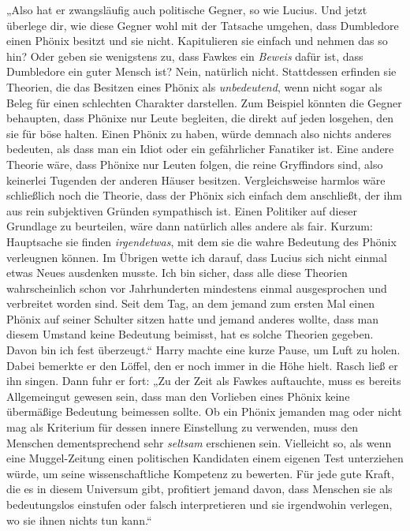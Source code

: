 „Also hat er zwangsläufig auch politische Gegner, so wie Lucius. Und jetzt überlege dir, wie diese Gegner wohl mit der Tatsache umgehen, dass Dumbledore einen Phönix besitzt und sie nicht. Kapitulieren sie einfach und nehmen das so hin? Oder geben sie wenigstens zu, dass Fawkes ein \emph{Beweis} dafür ist, dass Dumbledore ein guter Mensch ist? Nein, natürlich nicht. Stattdessen erfinden sie Theorien, die das Besitzen eines Phönix als \emph{unbedeutend}, wenn nicht sogar als Beleg für einen schlechten Charakter darstellen. Zum Beispiel könnten die Gegner behaupten, dass Phönixe nur Leute begleiten, die direkt auf jeden losgehen, den sie für böse halten. Einen Phönix zu haben, würde demnach also nichts anderes bedeuten, als dass man ein Idiot oder ein gefährlicher Fanatiker ist. Eine andere Theorie wäre, dass Phönixe nur Leuten folgen, die reine Gryffindors sind, also keinerlei Tugenden der anderen Häuser besitzen. Vergleichsweise harmlos wäre schließlich noch die Theorie, dass der Phönix sich einfach dem anschließt, der ihm aus rein subjektiven Gründen sympathisch ist. Einen Politiker auf dieser Grundlage zu beurteilen, wäre dann natürlich alles andere als fair. Kurzum: Hauptsache sie finden \emph{irgendetwas}, mit dem sie die wahre Bedeutung des Phönix verleugnen können. Im Übrigen wette ich darauf, dass Lucius sich nicht einmal etwas Neues ausdenken musste. Ich bin sicher, dass alle diese Theorien wahrscheinlich schon vor Jahrhunderten mindestens einmal ausgesprochen und verbreitet worden sind. Seit dem Tag, an dem jemand zum ersten Mal einen Phönix auf seiner Schulter sitzen hatte und jemand anderes wollte, dass man diesem Umstand keine Bedeutung beimisst, hat es solche Theorien gegeben. Davon bin ich fest überzeugt.“
%
Harry machte eine kurze Pause, um Luft zu holen. Dabei bemerkte er den Löffel, den er noch immer in die Höhe hielt. Rasch ließ er ihn singen.
Dann fuhr er fort: „Zu der Zeit als Fawkes auftauchte, muss es bereits Allgemeingut gewesen sein, dass man den Vorlieben eines Phönix keine übermäßige Bedeutung beimessen sollte. Ob ein Phönix jemanden mag oder nicht mag als Kriterium für dessen innere Einstellung zu verwenden, muss den Menschen dementsprechend sehr \emph{seltsam} erschienen sein. Vielleicht so, als wenn eine Muggel-Zeitung einen politischen Kandidaten einem eigenen Test unterziehen würde, um seine wissenschaftliche Kompetenz zu bewerten. Für jede gute Kraft, die es in diesem Universum gibt, profitiert jemand davon, dass Menschen sie als bedeutungslos einstufen oder falsch interpretieren und sie irgendwohin verlegen, wo sie ihnen nichts tun kann.“

